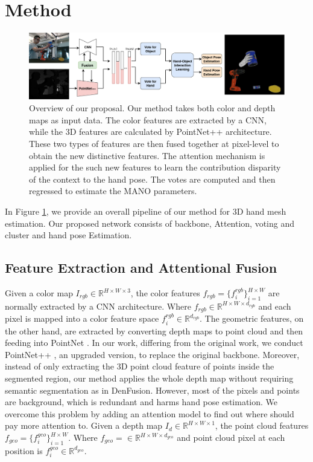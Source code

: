 \section{Method}
\label{sec:methodology}

\begin{figure}[h!]
	\centering
	\includegraphics[width=0.95\linewidth]{Figs/Hand-Object_pose.png}
	\caption{Overview of our proposal. Our method takes both color and depth maps as input data. The color features are extracted by a CNN, while the 3D features are calculated by PointNet++ architecture. These two types of features are then fused together at pixel-level to obtain the new distinctive features. The attention mechanism is applied for the such new features to learn the contribution disparity of the context to the hand pose. The votes are computed and then regressed to estimate the MANO parameters.}
	\label{fig:Hand pose}
\end{figure}

In Figure \ref{fig:Hand pose}, we provide an overall pipeline of our method for 3D hand mesh estimation. Our proposed network consists of backbone, Attention, voting and cluster and hand pose Estimation.

\subsection{Feature Extraction and Attentional Fusion}
\label{sec:data fusion}
Given a color map $I_{rgb} \in \mathbb{R}^{H \times W \times 3}$, the color features $f_{rgb} = \{ f^{rgb}_i \} ^{H \times W}_{i=1}$ are normally extracted by a CNN architecture. Where $f_{rgb} \in \mathbb{R}^{H \times W \times d_{rgb}}$ and each pixel is mapped into a color feature space $f^{rgb}_i \in \mathbb{R}^{d_{rgb}}$. The geometric features, on the other hand, are extracted by converting depth maps to point cloud and then feeding into PointNet \cite{qi2017pointnet}. In our work, differing from the original work, we conduct PointNet++ \cite{qi2017pointnet++}, an upgraded version, to replace the original backbone. Moreover, instead of only extracting the 3D point cloud feature of points inside the segmented region, our method applies the whole depth map without requiring semantic segmentation as in DenFusion. However, most of the pixels and points are background, which is redundant and harms hand pose estimation. We overcome this problem by adding an attention model to find out where should pay more attention to. Given a depth map $I_d \in \mathbb{R}^{H \times W \times 1}$, the point cloud features $f_{geo} = \{f^{geo}_i\}^{H \times W}_{i=1}$. Where $f_{geo} = \in \mathbb{R} ^{H \times W \times d_{geo}}$ and point cloud pixel at each position is $f^{geo}_i \in \mathbb{R}^{d_{geo}}$.

